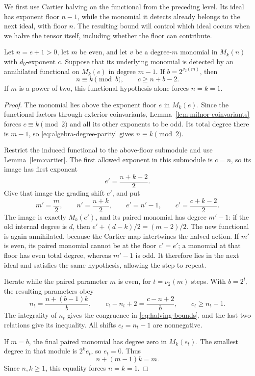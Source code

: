 We first use Cartier halving on the functional from the preceding
level. Its ideal has exponent floor $n-1$, while the monomial it
detects already belongs to the next ideal, with floor $n$. The
resulting bound will control which ideal occurs when we halve the
tensor itself, including whether the floor can contribute.

\begin{lemma}\label{lem:algebra-functional-halving}
Let $n=e+1>0$, let $m$ be even, and let $v$ be a degree-$m$ monomial
in $M_k(n)$ with $d_0$-exponent $c$.  Suppose that its underlying
monomial is detected by an annihilated functional on $M_k(e)$ in
degree $m-1$.  If $b=2^{\nu_2(m)}$, then
\begin{equation}\label{eq:halving-bounds}
 n\equiv k\pmod b,\qquad c\geq n+b-2.
\end{equation}
If $m$ is a power of two, this functional hypothesis alone forces
$n=k=1$.
\end{lemma}

\begin{proof}
The monomial lies above the exponent floor $e$ in $M_k(e)$.
Since the functional factors through exterior coinvariants,
Lemma~\ref{lem:milnor-coinvariants} forces
$c\equiv k\pmod2$ and all its other exponents to be odd.
Its total degree there is $m-1$, so
\eqref{eq:algebra-degree-parity} gives $n\equiv k\pmod2$.

Restrict the induced functional to the above-floor submodule and use
Lemma~\ref{lem:cartier}.  The first allowed exponent in this submodule
is $c=n$, so its image has first exponent
\[
 e'=\frac{n+k-2}{2}.
\]
Give that image the grading shift $e'$, and put
\begin{equation}\label{eq:algebra-functional-recursion}
 m'=\frac m2,\qquad n'=\frac{n+k}{2},\qquad
 e'=n'-1,\qquad c'=\frac{c+k-2}{2}.
\end{equation}
The image is exactly $M_k(e')$, and its paired monomial has degree
$m'-1$: if the old internal degree is $d$, then
$e'+(d-k)/2=(m-2)/2$.
The new functional is again annihilated, because the Cartier map
intertwines the halved action.  If $m'$ is even, its paired monomial
cannot be at the floor $c'=e'$; a monomial at that floor has even
total degree, whereas $m'-1$ is odd.  It therefore lies in the next
ideal and satisfies the same hypothesis, allowing the step to repeat.

Iterate while the paired parameter $m$ is even, for
$t=\nu_2(m)$ steps.  With $b=2^t$, the resulting parameters obey
\[
 n_t=\frac{n+(b-1)k}{b},\qquad
 c_t-n_t+2=\frac{c-n+2}{b},\qquad c_t\geq n_t-1.
\]
The integrality of $n_t$ gives the congruence in
\eqref{eq:halving-bounds}, and the last two relations give its
inequality.  All shifts $e_t=n_t-1$ are nonnegative.

If $m=b$, the final paired monomial has degree zero in $M_k(e_t)$.
The smallest degree in that module is $2^ke_t$, so $e_t=0$.
Thus
\[
 n+(m-1)k=m.
\]
Since $n,k\geq1$, this equality forces $n=k=1$.
\end{proof}

